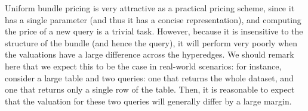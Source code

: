 Uniform bundle pricing is very attractive as a practical pricing scheme, since it has a single parameter (and thus it has a concise representation), and computing the price of a new query is a trivial task. 
However, because it is insensitive to the structure of the bundle (and hence the query), it will perform very poorly when the valuations have a large difference across the hyperedges. 
We should remark here that we expect this to be the case in real-world scenarios: for instance, consider a large table and two queries: one that returns the whole dataset, and one that returns only a single row of the table. Then, it is reasonable to expect that the valuation for these two queries will generally differ by a large margin. 




%

